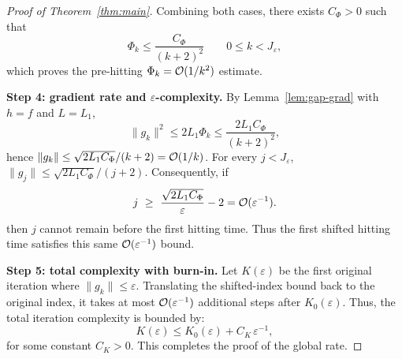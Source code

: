 \documentclass[review,onefignum,onetabnum]{siamart171218}
\begin{document}
\begin{proof}[Proof of Theorem~\ref{thm:main}]
		Combining both cases, there exists $C_\Phi>0$ such that
		\[
		\Phi_k\le \frac{C_\Phi}{(k+2)^2}\qquad 0\le k<J_\varepsilon,
		\]
		which proves the pre-hitting $\Phi_k=\mathcal{O}(1/k^2)$ estimate.
		
		\smallskip
		\noindent\textbf{Step 4: gradient rate and $\varepsilon$-complexity.}
		By Lemma~\ref{lem:gap-grad} with $h=f$ and $L=L_1$,
		\[
		\|g_k\|^2\le 2L_1\Phi_k\le \frac{2L_1 C_\Phi}{(k+2)^2},
		\]
		hence $\|g_k\|\le \sqrt{2L_1 C_\Phi}/(k+2)=\mathcal{O}(1/k)$.
		For every $j<J_\varepsilon$,
		$\|g_j\|\le \sqrt{2L_1 C_\Phi}/(j+2)$.
		Consequently, if
		\[
		j\ \ge\ \frac{\sqrt{2L_1 C_\Phi}}{\varepsilon}-2
		=\mathcal{O}(\varepsilon^{-1}).
		\]
		then $j$ cannot remain before the first hitting time. Thus the
		first shifted hitting time satisfies this same $\mathcal{O}(\varepsilon^{-1})$
		bound.
		
		\smallskip
		\noindent\textbf{Step 5: total complexity with burn-in.}
		Let $K(\varepsilon)$ be the first original iteration where
		$\|g_k\|\le \varepsilon$.
		Translating the shifted-index bound back to the original index,
		it takes at most $\mathcal{O}(\varepsilon^{-1})$ additional steps after
		$K_0(\varepsilon)$. Thus, the total iteration complexity is bounded by:
		\[
		K(\varepsilon)\le K_0(\varepsilon)+C_K\,\varepsilon^{-1},
		\]
		for some constant $C_K>0$. This completes the proof of the global rate.
	\end{proof}
	
\end{document}
